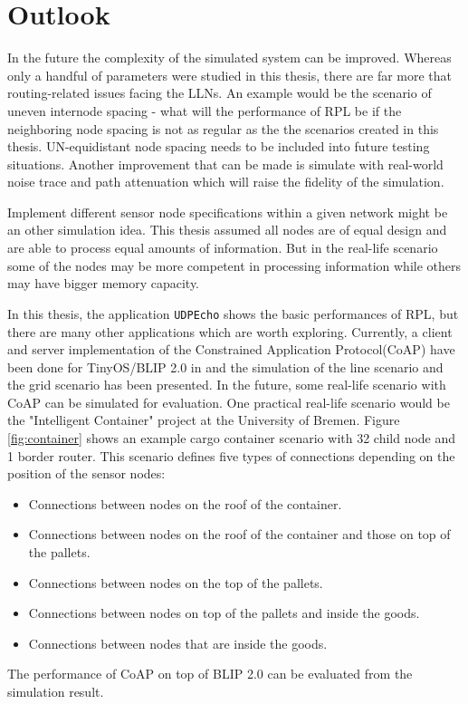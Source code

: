 \section{Outlook}
\label{outlook}

In the future the complexity of the simulated system can be improved. Whereas only a handful of parameters were studied in this thesis, there are far more that routing-related issues facing the LLNs. An example would be the scenario of uneven internode spacing - what will the performance of RPL be if the neighboring node spacing is not as regular as the the scenarios created in this thesis. UN-equidistant node spacing needs to be included into future testing situations. Another improvement that can be made is simulate with real-world noise trace and path attenuation which will raise the fidelity of the simulation.

Implement different sensor node specifications within a given network might be an other simulation idea.  This thesis assumed all nodes are of equal design and are able to process equal amounts of information. But in the real-life scenario some of the nodes may be more competent in processing information while others may have bigger memory capacity.

In this thesis, the application \texttt{UDPEcho} shows the basic performances of RPL, but there are many other applications which are worth exploring. Currently, a client and server implementation of the
Constrained Application Protocol(CoAP) have been done for TinyOS/BLIP 2.0 in \cite{TP11} and the simulation of the line scenario and the grid scenario has been presented. In the future, some real-life scenario with CoAP can be simulated for evaluation. One practical real-life scenario would be the "Intelligent Container" project at the University of Bremen. Figure \ref{fig:container} shows an example cargo container scenario with 32 child node and 1 border router. This scenario defines five types of connections depending on the position of the sensor nodes: 
\begin{itemize}
\item Connections between nodes on the roof of the container.
\item Connections between nodes on the roof of the container and those on top of the pallets.
\item Connections between nodes on the top of the pallets.
\item Connections between nodes on top of the pallets and inside the goods.
\item Connections between nodes that are inside the goods.
\end{itemize}
The performance of CoAP on top of BLIP 2.0 can be evaluated from the simulation result.   

